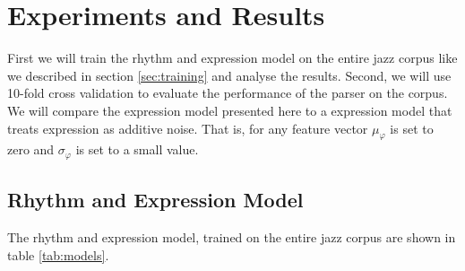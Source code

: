 \chapter{Experiments and Results}
\label{sec:results}

First we will train the rhythm and expression model on the entire jazz corpus like we described in section \ref{sec:training} and analyse the results. Second, we will use 10-fold cross validation to evaluate the performance of the parser on the corpus. We will compare the expression model presented here to a expression model that treats expression as additive noise. That is, for any feature vector $\mu_\varphi$ is set to zero and $\sigma_\varphi$ is set to a small value.

\section{Rhythm and Expression Model}

The rhythm and expression model, trained on the entire jazz corpus are shown in table \ref{tab:models}. 

